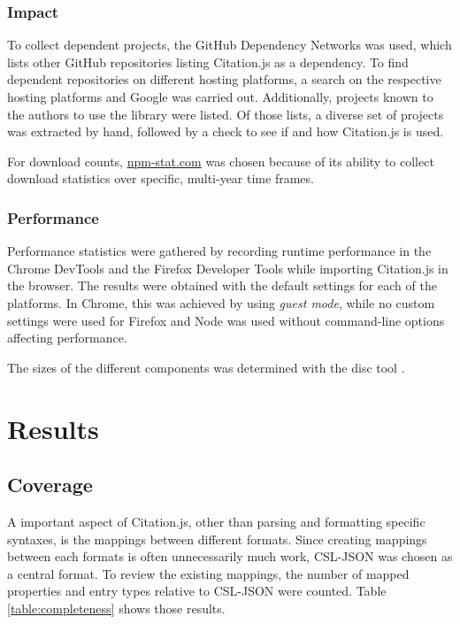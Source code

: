 \documentclass[fleqn,10pt,lineno]{wlpeerj} %
\begin{document}
\subsubsection*{Impact}

To collect dependent projects, the GitHub Dependency Networks was used, which lists other GitHub repositories listing Citation.js as a dependency. To find dependent repositories on different hosting platforms, a search on the respective hosting platforms and Google was carried out. Additionally, projects known to the authors to use the library were listed. Of those lists, a diverse set of projects was extracted by hand, followed by a check to see if and how Citation.js is used.

For download counts, \url{npm-stat.com} was chosen because of its ability to collect download statistics over specific, multi-year time frames.

\subsubsection*{Performance}

Performance statistics were gathered by recording runtime performance in the Chrome DevTools and the Firefox Developer Tools while importing Citation.js in the browser. The results were obtained with the default settings for each of the platforms. In Chrome, this was achieved by using \emph{guest mode}, while no custom settings were used for Firefox and Node was used without command-line options affecting performance.

The sizes of the different components was determined with the disc tool \citep{Kennedy2019hughsk}.

\section*{Results}

\subsection*{Coverage}

A important aspect of Citation.js, other than parsing and formatting specific syntaxes, is the mappings between different formats. Since creating mappings between each formats is often unnecessarily much work, CSL-JSON was chosen as a central format. To review the existing mappings, the number of mapped properties and entry types relative to CSL-JSON were counted. Table \ref{table:completeness} shows those results.
\end{document}

